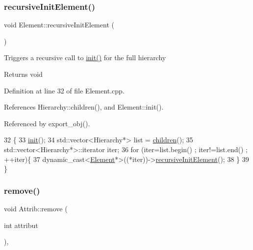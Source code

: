 \subsubsection{\texorpdfstring{recursive\+Init\+Element()}{recursiveInitElement()}}
{\footnotesize\ttfamily void Element\+::recursive\+Init\+Element (\begin{DoxyParamCaption}{ }\end{DoxyParamCaption})\hspace{0.3cm}{\ttfamily [inherited]}}

Triggers a recursive call to \hyperlink{classA3PE_abe07bae8ce2f32926b7258f269ae655e}{init()} for the full hierarchy

\begin{DoxyReturn}{Returns}
void 
\end{DoxyReturn}


Definition at line 32 of file Element.\+cpp.



References Hierarchy\+::children(), and Element\+::init().



Referenced by export\+\_\+obj().


\begin{DoxyCode}
32                                   \{
33   \hyperlink{classElement_af42754b5cabc198869222725218d695c}{init}();
34   std::vector<Hierarchy*> list = \hyperlink{classHierarchy_aa9a76f69e98e052ee1a6e32cea006288}{children}();
35   std::vector<Hierarchy*>::iterator iter;
36   \textcolor{keywordflow}{for} (iter=list.begin() ; iter!=list.end() ; ++iter)\{
37     \textcolor{keyword}{dynamic\_cast<}\hyperlink{classElement}{Element}*\textcolor{keyword}{>}((*iter))->\hyperlink{classElement_a3c0abcb36f8906688bb7e32608df7086}{recursiveInitElement}();
38   \}
39 \}
\end{DoxyCode}
\mbox{\label{classAttrib_a7d4ef7e32d93cb287792b87b857e79f3}} 
\subsubsection{\texorpdfstring{remove()}{remove()}}
{\footnotesize\ttfamily void Attrib\+::remove (\begin{DoxyParamCaption}\item[{int}]{attribut }\end{DoxyParamCaption})\hspace{0.3cm}{\ttfamily [inline]}, {\ttfamily [inherited]}}

